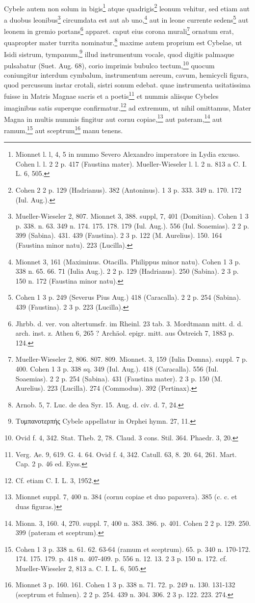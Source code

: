 \documentclass[a4paper, 11pt, oneside, polutonikogreek, german, twocolumn]{article}
\begin{document}
\paragraph{}
Cybele autem non solum in bigis\footnote{Mionnet l. l, 4, 5 in nummo Severo Alexandro imperatore in Lydia excuso. Cohen l. l. 2 2 p. 417 (Faustina mater). Mueller-Wieseler l. l. 2 n. 813 a C. I. L. 6, 505.} atque quadrigis\footnote{Cohen 2 2 p. 129 (Hadrianus). 382 (Antoninus). 1 3 p. 333. 349 n. 170. 172 (Iul. Aug.).} leonum vehitur, sed etiam aut a duobus leonibus\footnote{Mueller-Wieseler 2, 807. Mionnet 3, 388. suppl, 7, 401 (Domitian). Cohen 1 3 p. 338. n. 63. 349 n. 174. 175. 178. 179 (Iul. Aug.). 556 (Iul. Soaemias). 2 2 p. 399 (Sabina). 431. 439 (Faustina). 2 3 p. 122 (M. Aurelius). 150. 164 (Faustina minor natu). 223 (Lucilla).} circumdata est aut ab uno,\footnote{Mionnet 3, 161 (Maximinus. Otacilla. Philippus minor natu). Cohen 1 3 p. 338 n. 65. 66. 71 (Iulia Aug.). 2 2 p. 129 (Hadrianus). 250 (Sabina). 2 3 p. 150 n. 172 (Faustina minor natu).} aut in leone currente sedens\footnote{Cohen 1 3 p. 249 (Severus Pius Aug.) 418 (Caracalla). 2 2 p. 254 (Sabina). 439 (Faustina). 2 3 p. 223 (Lucilla).} aut leonem in gremio portans\footnote{Jhrbb. d. ver. von altertumsfr. im Rheinl. 23 tab. 3. Mordtmann mitt. d. d. arch. inst. z. Athen 6, 265 ? Archäol. epigr. mitt. aus Östreich 7, 1883 p. 124.} apparet. caput eius corona murali\footnote{Mueller-Wieseler 2, 806. 807. 809. Mionnet. 3, 159 (Iulia Domna). suppl. 7 p. 400. Cohen 1 3 p. 338 sq. 349 (Iul. Aug.). 418 (Caracalla). 556 (Iul. Soaemias). 2 2 p. 254 (Sabina). 431 (Faustina mater). 2 3 p. 150 (M. Aurelius). 223 (Lucilla). 274 (Commodus). 392 (Pertinax).} ornatum erat, quapropter mater turrita nominatur.\footnote{Arnob. 5, 7. Luc. de dea Syr. 15. Aug. d. civ. d. 7, 24.} maxime autem proprium est Cybelae, ut Isidi sistrum, tympanum,\footnote{Τυμπανοτερπής Cybele appellatur in Orphei hymn. 27, 11.} illud instrumentum vocale, quod digitis palmaque pulsabatur (Suet. Aug. 68), corio imprimis bubulco tectum,\footnote{Ovid f. 4, 342. Stat. Theb. 2, 78. Claud. 3 cons. Stil. 364. Phaedr. 3, 20.} quocum coniungitur interdum cymbalum, instrumentum aereum, cavum, hemicycli figura, quod percussum instar crotali, sistri sonum edebat. quae instrumenta usitatissima fuisse in Matris Magnae sacris et a poetis\footnote{Verg. Ae. 9, 619. G. 4. 64. Ovid f. 4, 342. Catull. 63, 8. 20. 64, 261. Mart. Cap. 2 p. 46 ed. Eyss.} et nummis aliisque Cybeles imaginibus satis superque confirmatur.\footnote{Cf. etiam C. I. L. 3, 1952.} ad extremum, ut nihil omittamus, Mater Magna in multis nummis fingitur aut cornu copiae,\footnote{Mionnet suppl. 7, 400 n. 384 (cornu copiae et duo papavera). 385 (c. c. et duas figuras.)} aut pateram,\footnote{Mionn. 3, 160. 4, 270. suppl. 7, 400 n. 383. 386. p. 401. Cohen 2 2 p. 129. 250. 399 (pateram et sceptrum).} aut ramum,\footnote{Cohen 1 3 p. 338 n. 61. 62. 63-64 (ramum et sceptrum). 65. p. 340 n. 170-172. 174. 175. 179. p. 418 n. 407-409. p. 556 n. 12. 13. 2 3 p. 150 n. 172. cf. Mueller-Wieseler 2, 813 a. C. I. L. 6, 505.} aut sceptrum\footnote{Mionnet 3 p. 160. 161. Cohen 1 3 p. 338 n. 71. 72. p. 249 n. 130. 131-132 (sceptrum et fulmen). 2 2 p. 254. 439 n. 304. 306. 2 3 p. 122. 223. 274.} manu tenens.
\end{document}
